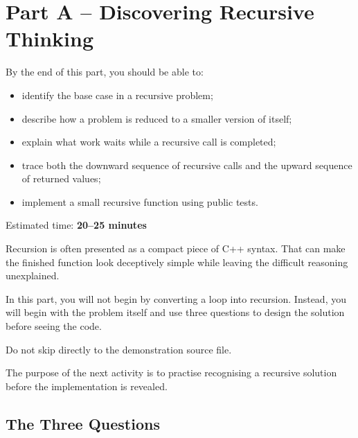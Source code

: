 \documentclass{csc2059practical}
\begin{document}
\clearpage

\section{Part A -- Discovering Recursive Thinking}

\begin{learningoutcomes}
By the end of this part, you should be able to:

\begin{itemize}
    \item identify the base case in a recursive problem;
    \item describe how a problem is reduced to a smaller version of itself;
    \item explain what work waits while a recursive call is completed;
    \item trace both the downward sequence of recursive calls and the upward
          sequence of returned values;
    \item implement a small recursive function using public tests.
\end{itemize}
\end{learningoutcomes}

\begin{infobox}
Estimated time: \textbf{20--25 minutes}
\end{infobox}

Recursion is often presented as a compact piece of C++ syntax. That can make the
finished function look deceptively simple while leaving the difficult reasoning
unexplained.

In this part, you will not begin by converting a loop into recursion. Instead,
you will begin with the problem itself and use three questions to design the
solution before seeing the code.

\begin{importantnote}
Do not skip directly to the demonstration source file.

The purpose of the next activity is to practise recognising a recursive
solution before the implementation is revealed.
\end{importantnote}

\subsection{The Three Questions}
\end{document}
